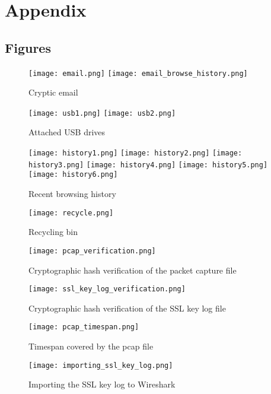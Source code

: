\section{Appendix}
\subsection{Figures} %
\label{sec:Figures}

\begin{figure}[H]
    \centering
    \texttt{[image: email.png]}
    \texttt{[image: email\_browse\_history.png]}
    \caption{Cryptic email}
    \label{fig:email}
\end{figure}

\begin{figure}[H]
    \centering
    \texttt{[image: usb1.png]}
    \texttt{[image: usb2.png]}
    \caption{Attached USB drives}
    \label{fig:usb}
\end{figure}

\begin{figure}[H]
    \centering
    \texttt{[image: history1.png]}
    \texttt{[image: history2.png]}
    \texttt{[image: history3.png]}
    \texttt{[image: history4.png]}
    \texttt{[image: history5.png]}
    \texttt{[image: history6.png]}
    \caption{Recent browsing history}
    \label{fig:webhistory}
\end{figure}

\begin{figure}[H]
    \centering
    \texttt{[image: recycle.png]}
    \caption{Recycling bin}
    \label{recycle}
\end{figure}

\begin{figure}[H]
    \centering
    \texttt{[image: pcap\_verification.png]}
    \caption{Cryptographic hash verification of the packet capture file}
    \label{pcap_verification}
\end{figure}

\begin{figure}[H]
    \centering
    \texttt{[image: ssl\_key\_log\_verification.png]}
    \caption{Cryptographic hash verification of the SSL key log file}
    \label{ssl_key_log_verification}
\end{figure}
\begin{figure}[H]
    \centering
    \texttt{[image: pcap\_timespan.png]}
    \caption{Timespan covered by the pcap file}
    \label{pcap_timespan}
\end{figure}
\begin{figure}[H]
    \centering
    \texttt{[image: importing\_ssl\_key\_log.png]}
    \caption{Importing the SSL key log to Wireshark}
    \label{importing_ssl_key_log}
\end{figure}

